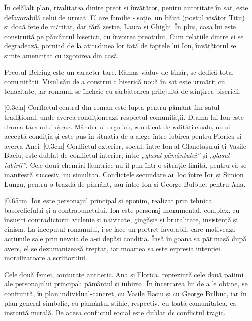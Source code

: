 \documentclass[
12pt,
a4paper
]{article}
\begin{document}
În celălalt plan, rivalitatea dintre preot și învățător, pentru autoritate în sat, este defavorabilă celui de urmat. El are familie - soție, un băiat (poetul visător Titu) și două fete de măritat, dar fără zestre, Laura și Ghighi. În plus, casa lui este construită pe pământul bisericii, cu învoirea preotului. Cum relațiile dintre ei se degradează, pornind de la atitudinea lor față de faptele lui Ion, învățătorul se simte amenințat cu izgonirea din casă.

Preotul Belciug este un caracter tare. Rămas văduv de tânăr, se dedică total comunității. Visul său de a construi o biserică nouă în sat este urmărit cu tenacitate, iar romanul se încheie cu sărbătoarea prilejuită de sfințirea bisericii.

[0.3cm]
Conflictul central din roman este lupta pentru pământ din satul tradițional, unde averea condiționează respectul comunității. Drama lui Ion este drama țăranului sărac. Mândru și orgolios, conștient de calitățile sale, nu-și acceptă condiția și este pus în situația de a alege între iubirea pentru Florica și averea Anei.
[0.3cm]
Conflictul exterior, social, între Ion al Glanetașului ți Vasile Baciu, este dublat de conflictul interior, între \textit{„glasul pământului”} și \textit{„glasul iubirii”}. Cele două chemări lăuntrice nu îl pun într-o situație-limită, pentru că se manifestă succesiv, nu simultan. Conflictele secundare au loc între Ion și Simion Lungu, pentru o brazdă de pământ, sau între Ion și George Bulbuc, pentru Ana.

[0.65cm]
Ion este personajul principal și eponim, realizat prin tehnica basoreliefului și a contrapunctului. Ion este personaj monumental, complex, cu însușiri contradictorii: viclenie și naivitate, gingășie și brutalitate, insistență și cinism. La începutul romanului, i se face un portret favorabil, care motivează acțiunile sale prin nevoia de a-și depăși condiția. Însă în goana sa pătimașă după avere, el se dezumanizează treptat, iar moartea sa este expresia intenției moralizatoare a scriitorului.

Cele două femei, conturate antitetic, Ana și Florica, reprezintă cele două patimi ale personajului principal: pământul și  iubirea. În încercarea lui de a le obține, se confruntă, în plan individual-concret, cu Vasile Baciu și cu George Bulbuc, iar în plan general-simbolic, cu pământul-stihie, respectiv, cu toată comunitatea, ca instanță morală. De aceea conflictul social este dublat de conflictul tragic.
\end{document}
